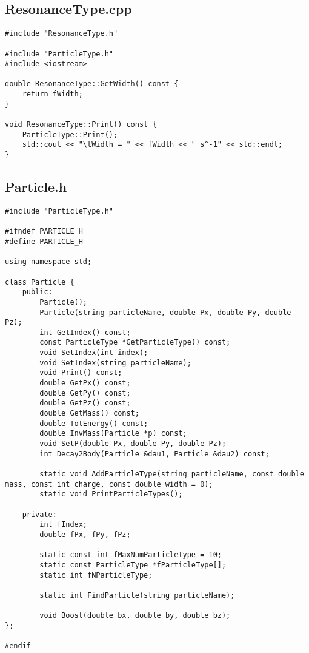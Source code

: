 \documentclass{article}
\begin{document}
\subsection*{ResonanceType.cpp}
\begin{verbatim}
#include "ResonanceType.h"

#include "ParticleType.h"
#include <iostream>

double ResonanceType::GetWidth() const {
    return fWidth;
}

void ResonanceType::Print() const {
    ParticleType::Print();
    std::cout << "\tWidth = " << fWidth << " s^-1" << std::endl;
}
\end{verbatim}

\subsection*{Particle.h}
\begin{verbatim}
#include "ParticleType.h"

#ifndef PARTICLE_H
#define PARTICLE_H

using namespace std;

class Particle {
    public:
        Particle();
        Particle(string particleName, double Px, double Py, double Pz);
        int GetIndex() const;
        const ParticleType *GetParticleType() const;
        void SetIndex(int index);
        void SetIndex(string particleName);
        void Print() const;
        double GetPx() const;
        double GetPy() const;
        double GetPz() const;
        double GetMass() const;
        double TotEnergy() const;
        double InvMass(Particle *p) const;
        void SetP(double Px, double Py, double Pz);
        int Decay2Body(Particle &dau1, Particle &dau2) const;

        static void AddParticleType(string particleName, const double mass, const int charge, const double width = 0);
        static void PrintParticleTypes();

    private:
        int fIndex;
        double fPx, fPy, fPz;

        static const int fMaxNumParticleType = 10;
        static const ParticleType *fParticleType[];
        static int fNParticleType;

        static int FindParticle(string particleName);

        void Boost(double bx, double by, double bz);
};

#endif
\end{verbatim}
\end{document}
